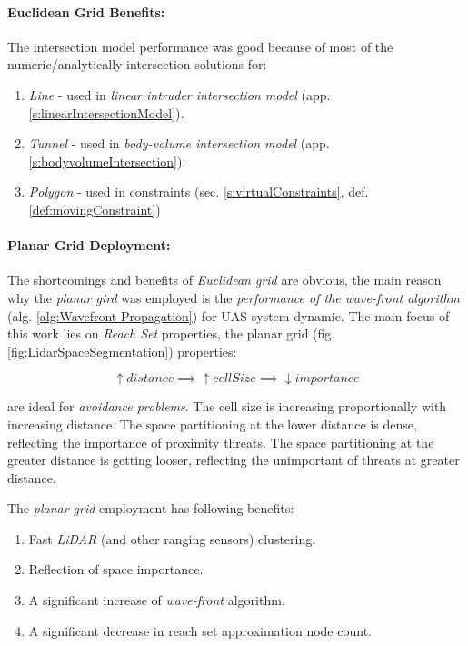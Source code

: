 \paragraph{Euclidean Grid Benefits:} The intersection model performance was good because of most of the numeric/analytically intersection solutions for:
\begin{enumerate}
    \item \emph{Line} - used in \emph{linear intruder intersection model} (app. \ref{s:linearIntersectionModel}).
    
    \item \emph{Tunnel} - used in \emph{body-volume intersection model} (app. \ref{s:bodyvolumeIntersection}).
    
    \item \emph{Polygon} - used in constraints (sec. \ref{s:virtualConstraints}, def. \ref{def:movingConstraint})
\end{enumerate}

\paragraph{Planar Grid Deployment:} The shortcomings and benefits of \emph{Euclidean grid} are obvious, the main reason why the \emph{planar gird} was employed is the \emph{performance of the wave-front algorithm} (alg. \ref{alg:Wavefront Propagation}) for UAS system dynamic. The main focus of this work lies on \emph{Reach Set} properties, the planar grid (fig. \ref{fig:LidarSpaceSegmentation}) properties:

\begin{equation*}
    \uparrow distance \implies \uparrow cell Size \implies \downarrow importance
\end{equation*}

\noindent are ideal for \emph{avoidance problems}. The cell size is increasing proportionally with increasing distance. The space partitioning at the lower distance is dense, reflecting the importance of proximity threats. The space partitioning at the greater distance is getting looser, reflecting the unimportant of threats at greater distance. 

\noindent The \emph{planar grid} employment has following benefits:
\begin{enumerate}
    \item Fast \emph{LiDAR} (and other ranging sensors) clustering.
    \item Reflection of space importance.
    \item A significant increase of \emph{wave-front} algorithm.
    \item A significant decrease in reach set approximation node count.
\end{enumerate}

